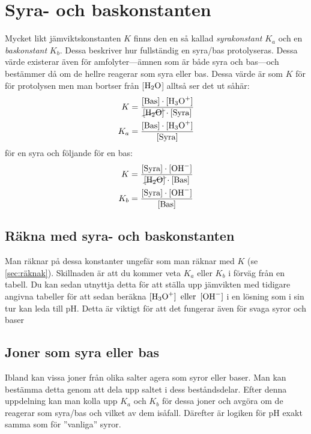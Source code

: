 \section{Syra- och baskonstanten}
Mycket likt jämviktskonstanten $K$ finns den en så kallad \emph{syrakonstant} $K_a$ och en \emph{baskonstant} $K_b$. Dessa beskriver hur fullständig en syra/bas protolyseras. Dessa värde existerar även för amfolyter---ämnen som är både syra och bas---och bestämmer då om de hellre reagerar som syra eller bas. Dessa värde är som $K$ för för protolysen men man bortser från [$\ce{H2O}$] alltså ser det ut såhär:
\begin{align*}
    K &= \frac{\mathrm{[Bas]} \cdot [\ce{H3O+}]}{\cancel{\ce{[H2O]}} \cdot \mathrm{[Syra]}} \\
    K_a &= \frac{\mathrm{[Bas]} \cdot [\ce{H3O+}]}{\mathrm{[Syra]}} 
\end{align*}
för en syra och följande för en bas:\begin{align*}
    K &= \frac{\mathrm{[Syra]} \cdot [\ce{OH^-}]}{\cancel{\ce{[H2O]}} \cdot \mathrm{[Bas]}} \\
    K_b&= \frac{\mathrm{[Syra]} \cdot [\ce{OH^-}]}{\mathrm{[Bas]}} 
\end{align*}

\subsection{Räkna med syra- och baskonstanten}
Man räknar på dessa konstanter ungefär som man räknar med $K$ (se \vref{sec:räknak}). Skillnaden är att du kommer veta $K_a \text{ eller } K_b$ i förväg från en tabell. Du kan sedan utnyttja detta för att ställa upp jämvikten med tidigare angivna tabeller för att sedan beräkna $\ce{[H3O+] \text{ eller } [OH^-]}$ i en lösning som i sin tur kan leda till pH. Detta är viktigt för att det fungerar även för svaga syror och baser

\subsection{Joner som syra eller bas}
Ibland kan vissa joner från olika salter agera som syror eller baser. Man kan bestämma detta genom att dela upp saltet i dess beståndsdelar. Efter denna uppdelning kan man kolla upp $K_a$ och $K_b$ för dessa joner och avgöra om de reagerar som syra/bas och vilket av dem isåfall. Därefter är logiken för pH exakt samma som för ''vanliga'' syror.

